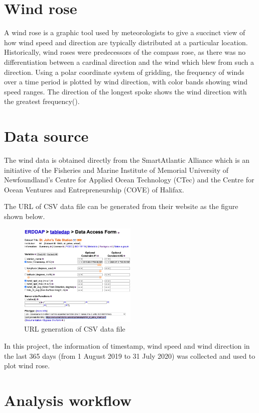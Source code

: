 
\section{Wind rose}

A wind rose is a graphic tool used by meteorologists to give a succinct view of how wind speed and direction are typically distributed at a particular location. Historically, wind roses were predecessors of the compass rose, as there was no differentiation between a cardinal direction and the wind which blew from such a direction. Using a polar coordinate system of gridding, the frequency of winds over a time period is plotted by wind direction, with color bands showing wind speed ranges. The direction of the longest spoke shows the wind direction with the greatest frequency(\cite{wikipedia}). \par


\section{Data source}
The wind data is obtained directly from the SmartAtlantic Alliance which is an initiative of the Fisheries and Marine Institute of Memorial University of Newfoundland's Centre for Applied Ocean Technology (CTec) and the Centre for Ocean Ventures and Entrepreneurship (COVE) of Halifax.\par
The URL of CSV data file can be generated from their website as the figure shown below.\par

\begin{figure}[h!]
    \centering
    \includegraphics[width=0.50\textwidth]{images/data_source.png}
    \caption{URL generation of CSV data file}
    \label{fig: PaleBlueDot}    
\end{figure}

In this project, the information of timestamp, wind speed and wind direction in the last 365 days (from 1 August 2019 to 31 July 2020) was collected and used to plot wind rose.\par

\section{Analysis workflow}
